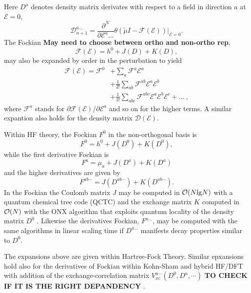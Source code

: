 \documentclass[prl,aps,twocolumn,showpacs,twocolumngrid,superbib]{revtex4}
\def\F{\mathcal{F}}
\def\D{\mathcal{D}}
\def\E{\mathcal{E}}
\begin{document}
Here $D^{a}$ denotes density matrix derivates with respect to a field in  direction $a$ 
at $\mathcal{E} = 0$,
\begin{equation}
 \displaystyle\D^{a\ldots}_{n+1}=
 \frac{\partial^N}{\partial\E^a\ldots}\theta(\tilde{\mu}I-
 \F(\E))\bigg|_{\E=0} \label{DDeriv}.
\end{equation}
 The Fockian {\bf May need to choose between ortho and non-ortho rep}, 
\begin{equation}
\F(\E) = h^0+J(D)+K(D),
\end{equation}
may also be expanded by order in the perturbation to yield
\begin{equation}\label{FockianTaylor}
  \begin{split}
    \F(\E)=\F^{0} & +\sum_a \F^{a}\E^{a}\\
    &+\frac{1}{2!}\sum_{ab} \F^{ab}\E^{a}\E^{b}\\
    &+\frac{1}{3!}\sum_{abc} \F^{abc}\E^{a}\E^{b}\E^{c}+\dots ~,
  \end{split}
\end{equation}
where $\F^{a}$ stands for $\partial\F(\E)/\partial\E^{a}$ 
and so on for the higher terms.
A similar expantion also holds for the density matrix $\D(\E)$.

Within HF theory, the Fockian $F^0$ in the non-orthogonal 
basis is 
\begin{equation}
F^0=h^0+J(D^0)+K(D^0), 
\end{equation}
while the first derivative Fockian is 
\begin{equation}
F^a=\mu_a+J(D^a)+K(D^a)
\end{equation}
and the higher derivatives are given by 
\begin{equation}
F^{ab\cdots}=J(D^{ab\cdots})+K(D^{ab\cdots}). 
\end{equation}
In the Fockian the Coulomb matrix $J$ may be computed in ${\cal O}(N{\rm lg}N)$ 
with a quantum chemical tree code (QCTC) \cite{MChallacombe97} and the
exchange matrix $K$ computed in ${\cal O}(N)$ with the ONX algorithm 
that exploits quantum locality of the density matrix $D^0$ \cite{ESchwegler97}.
Likewise the derivatives Fockian, $F^{a\ldots}$, may be computed 
with the same algorithms in linear scaling time if 
$D^{a\ldots}$ manifests decay properties similar to $D^0$. 

The expansions above are given within Hartree-Fock Theory. 
Similar epxansions hold also for the derivatives of Fockian
within Kohn-Sham and hybrid HF/DFT with addition of 
the exchange-correlation matrix $V_{xc}^{a\cdots}(D^0,D^a,\cdots)$ 
{\bf TO CHECK IF IT IS THE RIGHT DEPANDENCY} \cite{Lee_1994}.
\end{document}
